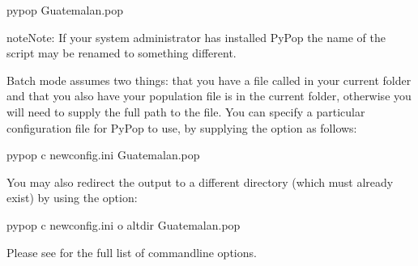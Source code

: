 \documentclass[letterpaper,10pt,english,openany,oneside]{sphinxmanual}
\begin{document}
\begin{sphinxVerbatim}[commandchars=\\\{\}]
pypop Guatemalan.pop
\end{sphinxVerbatim}

\begin{sphinxadmonition}{note}{Note:}
\sphinxAtStartPar
If your system administrator has installed PyPop the name of the
script may be renamed to something different.
\end{sphinxadmonition}

\sphinxAtStartPar
Batch mode assumes two things: that you have a file called
 in your current folder and that you also have your
population file is in the current folder, otherwise you will need to
supply the full path to the file. You can specify a particular
configuration file for PyPop to use, by supplying the  option as
follows:

\begin{sphinxVerbatim}[commandchars=\\\{\}]
pypop \PYGZhy{}c newconfig.ini Guatemalan.pop
\end{sphinxVerbatim}

\sphinxAtStartPar
You may also redirect the output to a different directory (which must
already exist) by using the  option:

\begin{sphinxVerbatim}[commandchars=\\\{\}]
pypop \PYGZhy{}c newconfig.ini \PYGZhy{}o altdir Guatemalan.pop
\end{sphinxVerbatim}

\sphinxAtStartPar
Please see {\hyperref[\detokenize{docs/guide-chapter-usage:guide-pypop-cli}]{}} for the full list of command\sphinxhyphen{}line
options.
\end{document}
